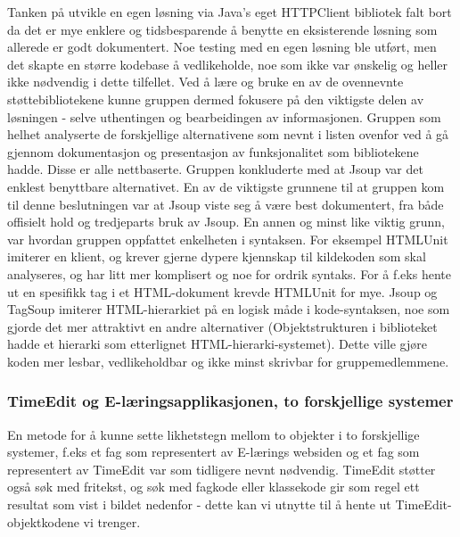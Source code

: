 \documentclass[../main.tex]{subfiles}
\begin{document}
Tanken på utvikle en egen løsning via Java’s eget HTTPClient bibliotek falt bort da det er mye enklere og tidsbesparende å benytte en eksisterende løsning som allerede er godt dokumentert. Noe testing med en egen løsning ble utført, men det skapte en større kodebase å vedlikeholde, noe som ikke var ønskelig og heller ikke nødvendig i dette tilfellet. Ved å lære og bruke en av de ovennevnte støttebibliotekene kunne gruppen dermed fokusere på den viktigste delen av løsningen - selve uthentingen og bearbeidingen av informasjonen.\newline
\newline
Gruppen som helhet analyserte de forskjellige alternativene som nevnt i listen ovenfor ved å gå gjennom dokumentasjon og presentasjon av funksjonalitet som bibliotekene hadde. Disse er alle nettbaserte.
Gruppen konkluderte med at Jsoup var det enklest benyttbare alternativet. En av de viktigste grunnene til at gruppen kom til denne beslutningen var at Jsoup viste seg å være best dokumentert, fra både offisielt hold og tredjeparts bruk av Jsoup. 
En annen og minst like viktig grunn, var hvordan gruppen oppfattet enkelheten i syntaksen. For eksempel HTMLUnit imiterer en klient, og krever gjerne dypere kjennskap til kildekoden som skal analyseres, og har litt mer komplisert og noe for ordrik syntaks. For å f.eks hente ut en spesifikk tag i et HTML-dokument krevde HTMLUnit for mye.
Jsoup og TagSoup imiterer HTML-hierarkiet på en logisk måde i kode-syntaksen, noe som gjorde det mer attraktivt en andre alternativer (Objektstrukturen i biblioteket hadde et hierarki som etterlignet HTML-hierarki-systemet). Dette ville gjøre koden mer lesbar, vedlikeholdbar og ikke minst skrivbar for gruppemedlemmene. 

\subsubsection{TimeEdit og E-læringsapplikasjonen, to forskjellige systemer}

En metode for å kunne sette likhetstegn mellom to objekter i to forskjellige systemer, f.eks et fag som representert av E-lærings websiden og et fag som representert av TimeEdit var som tidligere nevnt nødvendig.\newline
\newline
TimeEdit støtter også søk med fritekst, og søk med fagkode eller klassekode gir som regel ett resultat som vist i bildet nedenfor - dette kan vi utnytte til å hente ut TimeEdit-objektkodene vi trenger.
\end{document}

